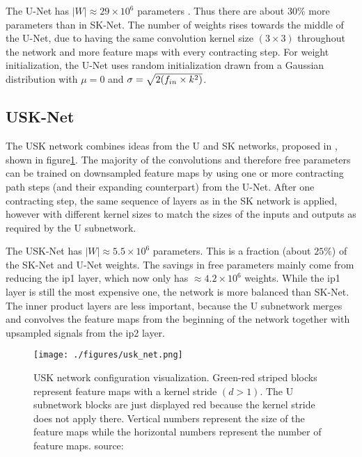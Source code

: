    
The U-Net has $ |W| \approx 29 \times 10^6 $  parameters \cite{DBLP:journals/corr/Tschopp15}. Thus there are about $30\%$ more parameters than in SK-Net. 
The number of weights rises towards the middle of the U-Net, due to having the same convolution kernel size $(3 \times 3)$ throughout the network and more feature maps with every contracting step.
For weight initialization, the U-Net uses random initialization drawn from a
Gaussian distribution with $ \mu = 0 $ and $ \sigma = \sqrt{2 \/( f_{in} \times k^2)}$.

\subsection{USK-Net}

The USK network combines ideas from the U and SK networks, proposed in \cite{DBLP:journals/corr/Tschopp15}, shown in figure\ref{fig:usk-net_arch}. The majority of the convolutions and therefore free parameters can be trained on downsampled feature maps by using one or more contracting path steps (and their expanding counterpart) from the U-Net.
After one contracting step, the same sequence of layers as in the SK network is applied, however with different kernel sizes to match the sizes of the inputs and outputs as required by the U subnetwork.

The USK-Net has $ |W| \approx 5.5 \times 10^6$ parameters. This is a fraction (about $25\%$) of the SK-Net and U-Net weights. 
The savings in free parameters mainly come from reducing the ip1 layer, which
now only has $\approx 4.2 \times 10^6$ weights. While the ip1 layer is still the most expensive one, the network is more balanced than SK-Net. The inner product layers are less important, because the U subnetwork merges and convolves the feature maps from the beginning of the network together with upsampled signals from the ip2 layer. 

\begin{figure}[ht!]
        \centering
        \texttt{[image: ./figures/usk\_net.png]}
        
        \caption{USK network configuration visualization. Green-red striped blocks
represent feature maps with a kernel stride $(d > 1)$. The U subnetwork blocks are just displayed red because the kernel stride does not apply there. Vertical numbers represent the size of the feature maps while the horizontal numbers represent the number of feature maps. source:\cite{DBLP:journals/corr/Tschopp15}}
\label{fig:usk-net_arch}
    \end{figure}
   
    


	